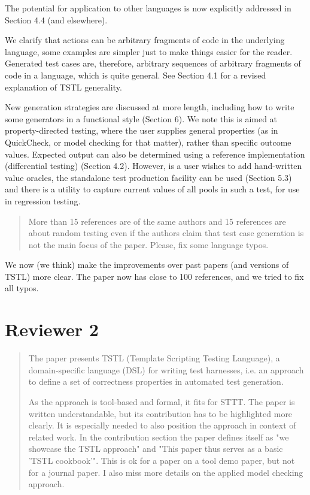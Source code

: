 \documentclass{article}[12pt]
\begin{document}
The potential for application to other languages is now explicitly addressed in Section 4.4 (and elsewhere).  

We clarify that actions can be arbitrary fragments of code in the underlying language, some examples are simpler just to make things easier for the reader.  Generated test cases are, therefore, arbitrary sequences of arbitrary fragments of code in a language, which is quite general.  See Section 4.1 for a revised explanation of TSTL generality.

New generation strategies are discussed at more length, including how to write some generators in a functional style (Section 6).  We note this is aimed at property-directed testing, where the user supplies general properties (as in QuickCheck, or model checking for that matter), rather than specific outcome values.  Expected output can also be determined using a reference implementation (differential testing) (Section 4.2).  However, is a user wishes to add hand-written value oracles, the standalone test production facility can be used (Section 5.3) and there is a utility to capture current values of all pools in such a test, for use in regression testing.  

\begin{quote}
More than 15 references are of the same authors and 15 references are about random 
testing even if the authors claim that test case generation is not the main focus of 
the paper.
Please, fix some language typos.
\end{quote}

We now (we think) make the improvements over past papers (and versions of TSTL) more clear.  The paper now has close to 100 references, and we tried to fix all typos.



\section{Reviewer 2}

\begin{quote}
The paper presents TSTL (Template Scripting Testing Language), a domain-specific 
language (DSL) for writing test harnesses, i.e. an approach to define a set of 
correctness properties in automated test generation.

As the approach is tool-based and formal, it fits for STTT. The paper is written 
understandable, but its contribution has to be highlighted more clearly. 
It is especially needed to also position the approach in context of related work. In 
the contribution section the paper defines itself as "we showcase the TSTL approach" 
and "This paper thus serves as a basic 'TSTL cookbook'". This is ok for a paper on a 
tool demo paper, but not for a journal paper. I also miss more details on the 
applied model checking approach.
\end{quote}
\end{document}
